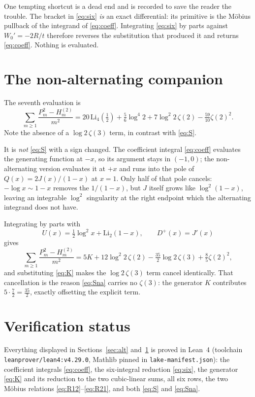 \documentclass[11pt]{article}
\begin{document}
One tempting shortcut is a dead end and is recorded to save the reader the
trouble.  The bracket in \eqref{eq:six} \emph{is} an exact differential:
its primitive is the M\"obius pullback of the integrand of
\eqref{eq:coeff}.  Integrating \eqref{eq:six} by parts against
$W_0' = -2R/t$ therefore reverses the substitution that produced it and
returns \eqref{eq:coeff}.  Nothing is evaluated.

\section{The non-alternating companion}\label{sec:nonalt}

The seventh evaluation is
\begin{equation}\label{eq:Sna}
\sum_{m\ge1} \frac{P_m^2 - H_m^{(2)}}{m^2}
 = 20\,\mathrm{Li}_4(\tfrac12) + \tfrac56\log^4 2
   + 7\log^2\!2\,\zeta(2) - \tfrac{59}{10}\zeta(2)^2 .
\end{equation}
Note the absence of a $\log 2\,\zeta(3)$ term, in contrast with \eqref{eq:S}.

It is \emph{not} \eqref{eq:S} with a sign changed.  The coefficient integral
\eqref{eq:coeff} evaluates the generating function at $-x$, so its argument
stays in $(-1,0)$; the non-alternating version evaluates it at $+x$ and runs
into the pole of $Q(x) = 2J(x)/(1-x)$ at $x=1$.  Only half of that pole
cancels: $-\log x \sim 1-x$ removes the $1/(1-x)$, but $J$ itself grows like
$\log^2(1-x)$, leaving an integrable $\log^2$ singularity at the right
endpoint which the alternating integrand does not have.

Integrating by parts with
\[
U(x) = \tfrac12\log^2 x + \mathrm{Li}_2(1-x),
\qquad
D^{+}(x) = J'(x)
\]
gives
\[
\sum_{m\ge1} \frac{P_m^2 - H_m^{(2)}}{m^2}
 = 5K + 12\log^2\!2\,\zeta(2) - \tfrac{35}{2}\log 2\,\zeta(3)
   + \tfrac85\zeta(2)^2 ,
\]
and substituting \eqref{eq:K} makes the $\log 2\,\zeta(3)$ term cancel
identically.  That cancellation is the reason \eqref{eq:Sna} carries no
$\zeta(3)$: the generator $K$ contributes $5\cdot\tfrac72 = \tfrac{35}{2}$,
exactly offsetting the explicit term.

\section{Verification status}

Everything displayed in Sections~\ref{sec:alt} and~\ref{sec:nonalt} is proved
in Lean~4 (toolchain \texttt{leanprover/lean4:v4.29.0}, Mathlib pinned in
\texttt{lake-manifest.json}): the coefficient integrals \eqref{eq:coeff},
the six-integral reduction \eqref{eq:six}, the generator \eqref{eq:K} and its
reduction to the two cubic-linear sums, all six rows, the two M\"obius
relations \eqref{eq:R12}--\eqref{eq:R21}, and both \eqref{eq:S} and
\eqref{eq:Sna}.
\end{document}
